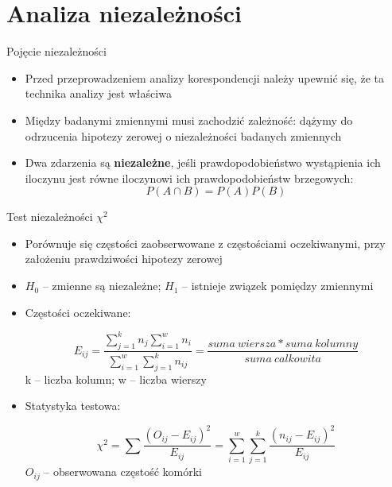 \documentclass{beamer}
\begin{document}
\section{Analiza niezależności}
\begin{frame}{Pojęcie niezależności}
  \begin{itemize}
  \item Przed przeprowadzeniem analizy korespondencji należy upewnić się, że ta technika analizy jest właściwa
  \item Między badanymi zmiennymi musi zachodzić zależność: dążymy do odrzucenia hipotezy zerowej o niezależności badanych zmiennych
  \item Dwa zdarzenia są \textbf{niezależne}, jeśli prawdopodobieństwo wystąpienia ich iloczynu jest równe iloczynowi ich prawdopodobieństw brzegowych:
    $$ P(A \cap B) = P(A)P(B) $$
  \end{itemize}
\end{frame}

\begin{frame}{Test niezależności $\chi^2$}
  \begin{itemize}
  \item Porównuje się częstości zaobserwowane z częstościami oczekiwanymi, przy założeniu prawdziwości hipotezy zerowej
  \item \textbf{$H_0$} -- zmienne są niezależne; \textbf{$H_1$} -- istnieje związek pomiędzy zmiennymi
  \item Częstości oczekiwane:
    \begin{scriptsize}
    $$E_{ij} = \frac{\sum_{j=1}^{k} n_{j} \sum_{i=1}^{w}n_{i}}{\sum_{i=1}^{w}\sum_{j=1}^k n_{ij}} = \frac{suma\ wiersza * suma\ kolumny}{suma\ calkowita} $$
      k -- liczba kolumn; w -- liczba wierszy
    \end{scriptsize}
  \item Statystyka testowa:
   \begin{scriptsize}
    $$\chi^2 = \sum \frac{(O_{ij}-E_{ij})^2}{E_{ij}} = \sum_{i=1}^{w}\sum_{j=1}^{k} \frac{(n_{ij}-E_{ij})^2}{E_{ij}}$$
     $O_{ij}$ -- obserwowana częstość komórki
    \end{scriptsize}
  \end{itemize}
\end{frame}
\end{document}
